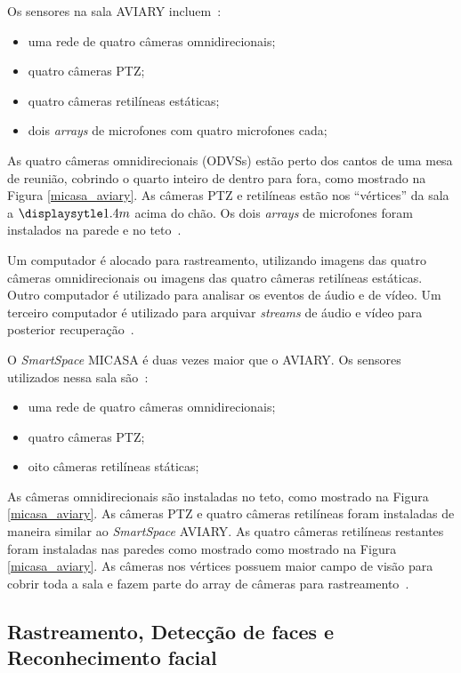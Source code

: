 Os sensores na sala AVIARY incluem~\cite{trivedi}:

	\begin{itemize}
		\item uma rede de quatro câmeras omnidirecionais;
		\item quatro câmeras PTZ;
		\item quatro câmeras retilíneas estáticas;
		\item dois \textit{arrays} de microfones com quatro microfones cada;
	\end{itemize}

As quatro câmeras omnidirecionais (ODVSs) estão perto dos cantos de uma mesa de reunião, cobrindo o quarto inteiro de dentro para fora, como mostrado na Figura \ref{micasa_aviary}. As câmeras PTZ e retilíneas estão nos ``vértices'' da sala a $\displaysytle 1.4m$ acima do chão. Os dois \textit{arrays} de microfones foram instalados na parede e no teto~\cite{trivedi}.

Um computador é alocado para rastreamento, utilizando imagens das quatro câmeras omnidirecionais ou imagens das quatro câmeras retilíneas estáticas. Outro computador é utilizado para analisar os eventos de áudio e de vídeo. Um terceiro computador é utilizado para arquivar \textit{streams} de áudio e vídeo para posterior recuperação~\cite{trivedi}.

O \textit{SmartSpace} MICASA é duas vezes maior que o AVIARY. Os sensores utilizados nessa sala são~\cite{trivedi}:
	
	\begin{itemize}
		\item uma rede de quatro câmeras omnidirecionais;
		\item quatro câmeras PTZ;
		\item oito câmeras retilíneas státicas;
	\end{itemize}

As câmeras omnidirecionais são instaladas no teto, como mostrado na Figura \ref{micasa_aviary}. As câmeras PTZ e quatro câmeras retilíneas foram instaladas de maneira similar ao \textit{SmartSpace} AVIARY. As quatro câmeras retilíneas restantes foram instaladas nas paredes como mostrado como mostrado na Figura \ref{micasa_aviary}. As câmeras nos vértices possuem maior campo de visão para cobrir toda a sala e fazem parte do array de câmeras para rastreamento~\cite{trivedi}.

\subsection{Rastreamento, Detecção de faces e Reconhecimento facial}
 
